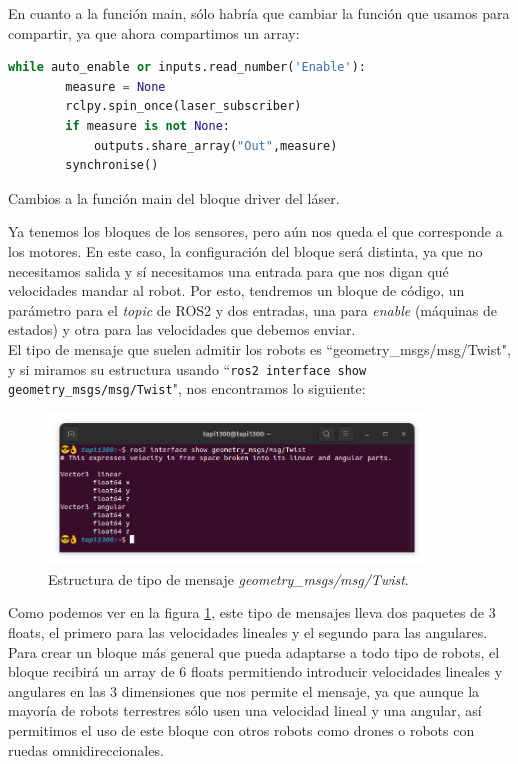 En cuanto a la función main, sólo habría que cambiar la función que usamos para compartir, ya que ahora compartimos un array:
\begin{code}[H]
  \begin{lstlisting}[language=python]
    while auto_enable or inputs.read_number('Enable'):
        measure = None
        rclpy.spin_once(laser_subscriber)
        if measure is not None:
            outputs.share_array("Out",measure)   
        synchronise()  
  \end{lstlisting}
  \caption[Cambios main bloque láser]{Cambios a la función main del bloque driver del láser.}
  \label{cod:laser_main_changes}
\end{code}

Ya tenemos los bloques de los sensores, pero aún nos queda el que corresponde a los motores.
En este caso, la configuración del bloque será distinta, ya que no necesitamos salida y sí necesitamos una entrada para que nos
digan qué velocidades mandar al robot. Por esto, tendremos un bloque de código, un parámetro para el \textit{topic} de ROS2 y dos
entradas, una para \textit{enable} (máquinas de estados) y otra para las velocidades que debemos enviar.\\

\newpage
El tipo de mensaje que suelen admitir los robots es ``geometry\_msgs/msg/Twist", y si miramos su estructura usando ``\lstinline|ros2 interface show geometry_msgs/msg/Twist|",
nos encontramos lo siguiente:
\begin{figure} [H]
  \begin{center}
      \includegraphics[width=10cm]{figs/c4/twist_struct.png}
  \end{center}
  \caption[Estructura mensaje Twist]{Estructura de tipo de mensaje \textit{geometry\_msgs/msg/Twist}.}
  \label{fig:twist_struct}
\end{figure}

Como podemos ver en la figura \ref{fig:twist_struct}, este tipo de mensajes lleva dos paquetes de 3 floats, el primero para las velocidades
lineales y el segundo para las angulares. Para crear un bloque más general que pueda adaptarse a todo tipo de robots, el bloque recibirá un array
de 6 floats permitiendo introducir velocidades lineales y angulares en las 3 dimensiones que nos permite el mensaje, ya que aunque la mayoría de
robots terrestres sólo usen una velocidad lineal y una angular, así permitimos el uso de este bloque con otros robots como drones o robots con ruedas
omnidireccionales.\\

